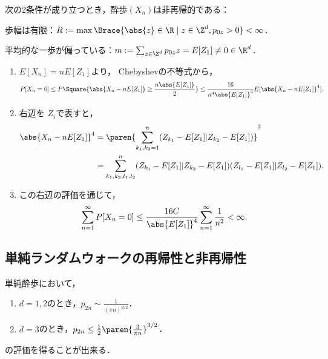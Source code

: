 \documentclass[uplatex,dvipdfmx]{jsreport}
\begin{document}
\begin{corollary}[非再帰性の十分条件]
    次の2条件が成り立つとき，酔歩$(X_n)$は非再帰的である：
    \begin{enumerate}[{[A}1{]}]
        \item 歩幅は有限：$R:=\max\Brace{\abs{z}\in\R\mid z\in\Z^d,p_{0z}>0}<\infty$．
        \item 平均的な一歩が偏っている：$m:=\sum_{z\in\Z^d}p_{0z}z=E[Z_1]\ne0\in\R^d$．
    \end{enumerate}
\end{corollary}
\begin{Proof}\mbox{}
    \begin{enumerate}[{Step}1]
        \item $E[X_n]=nE[Z_1]$より，
        Chebyshevの不等式から，
        \[P[X_n=0]\le P\Square{\abs{X_n-nE[Z_1]}\ge\frac{n\abs{E[Z_1]}}{2}}\le\frac{16}{n^4\abs{E[Z_1]}^4}E[\abs{X_n-nE[Z_1]}^4].\]
        \item 右辺を
        $Z_i$で表すと，
        \begin{align*}
            \abs{X_n-nE[Z_1]}^4&=\paren{\sum_{k_1,k_2=1}^n(Z_{k_1}-E[Z_1]|Z_{k_2}-E[Z_1])}^2\\
            &=\sum_{k_1,k_2,l_1,l_2}^n(Z_{k_1}-E[Z_1]|Z_{k_2}-E[Z_1])(Z_{l_1}-E[Z_1]|Z_{l_2}-E[Z_1]).
        \end{align*}
        \item この右辺の評価を通じて，
        \[\sum_{n=1}^\infty P[X_n=0]\le\frac{16 C}{\abs{E[Z_1]}^4}\sum_{n=1}^\infty\frac{1}{n^2}<\infty.\]
    \end{enumerate}
\end{Proof}

\subsection{単純ランダムウォークの再帰性と非再帰性}

\begin{tcolorbox}[colframe=ForestGreen, colback=ForestGreen!10!white,breakable,colbacktitle=ForestGreen!40!white,coltitle=black,fonttitle=\bfseries\sffamily,
title=]
    単純酔歩において，
    \begin{enumerate}
        \item $d=1,2$のとき，$p_{2n}\sim\frac{1}{(\pi n)^{d/2}}$．
        \item $d=3$のとき，$p_{2n}\le\frac{1}{2}\paren{\frac{3}{\pi n}}^{3/2}$．
    \end{enumerate}
    の評価を得ることが出来る．
\end{tcolorbox}
\end{document}

